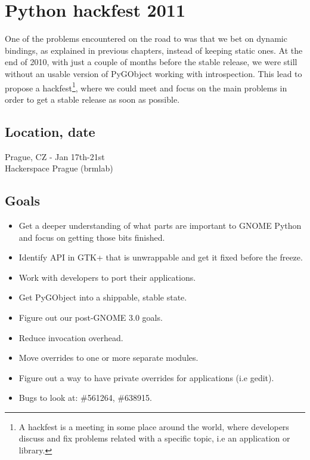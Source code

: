 \chapter{Python hackfest 2011}

One of the problems encountered on the road to  was that we bet on dynamic bindings, as explained in previous chapters, instead of keeping static ones. At the end of 2010, with just a couple of months before the stable release, we were still without an usable version of PyGObject working with introspection. This lead to propose a hackfest\footnote{A hackfest is a meeting in some place around the world, where developers discuss and fix problems related with a specific topic, i.e an application or library.}, where we could meet and focus on the main problems in order to get a stable release as soon as possible.

\section{Location, date}

Prague, CZ - Jan 17th-21st\\
Hackerspace Prague (brmlab)

\section{Goals}

\begin{itemize}
  \item Get a deeper understanding of what parts are important to GNOME Python and focus on getting those bits finished.
  \item Identify API in GTK+ that is unwrappable and get it fixed before the freeze.
  \item Work with developers to port their applications.
  \item Get PyGObject into a shippable, stable state.
  \item Figure out our post-GNOME 3.0 goals.
  \item Reduce invocation overhead.
  \item Move overrides to one or more separate modules.
  \item Figure out a way to have private overrides for applications (i.e gedit).
  \item Bugs to look at: \#561264, \#638915.
\end{itemize}

